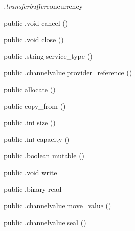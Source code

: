 \begin{CrexxClass}{\textit{.transferbuffer}}{concurrency}
\begin{Members}
    \Method
      {public}
      {.void}
      {cancel}
      {()}

    \Method
      {public}
      {.void}
      {close}
      {()}

    \Method
      {public}
      {.string}
      {service\_type}
      {()}

    \Method
      {public}
      {.channelvalue}
      {provider\_reference}
      {()}

    \Factory
      {public}
      {allocate}
      {()}

    \Factory
      {public}
      {copy\_from}
      {()}

    \Method
      {public}
      {.int}
      {size}
      {()}

    \Method
      {public}
      {.int}
      {capacity}
      {()}

    \Method
      {public}
      {.boolean}
      {mutable}
      {()}

    \Method
      {public}
      {.void}
      {write}
      {}

    \Method
      {public}
      {.binary}
      {read}
      {}

    \Method
      {public}
      {.channelvalue}
      {move\_value}
      {()}

    \Method
      {public}
      {.channelvalue}
      {seal}
      {()}

  \end{Members}
\end{CrexxClass}

